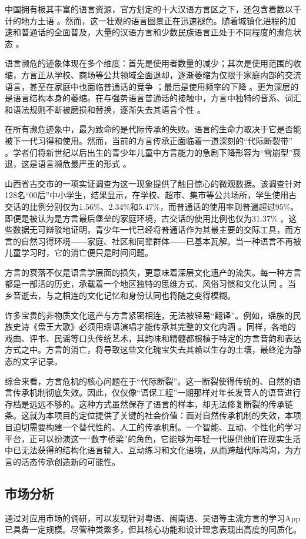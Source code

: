 中国拥有极其丰富的语言资源，官方划定的十大汉语方言区之下，还包含着数以千计的地方土语 。然而，这一壮观的语言图景正在迅速褪色。随着城镇化进程的加速和普通话的全面普及，大量的汉语方言和少数民族语言正处于不同程度的濒危状态 。

语言濒危的迹象体现在多个维度：首先是使用者数量的减少；其次是使用范围的收缩，方言正从学校、商场等公共领域全面退却，逐渐萎缩为仅限于家庭内部的交流语言，甚至在家庭中也面临普通话的竞争 ；最后是使用频率的下降 。更为深层的是语言结构本身的萎缩。在与强势语言普通话的接触中，方言中独特的音系、词汇和语法规则不断被磨损和替换，逐渐失去其语言个性 。

在所有濒危迹象中，最为致命的是代际传承的失败。语言的生命力取决于它是否能被下一代习得和使用。然而，当前的方言传承正面临着一道深刻的“代际断裂带” 。学者们将新世纪以后出生的青少年儿童中方言能力的急剧下降形容为“雪崩型”衰退，这是语言濒危最严重的形式 。

山西省古交市的一项实证调查为这一现象提供了触目惊心的微观数据。该调查针对128名“00后”中小学生，结果显示，在学校、超市、集市等公共场所，学生使用古交话的比例分别仅为1.56\%、2.34\%和5.47\%，而普通话的使用率则普遍超过95\%。即便是被认为是方言最后堡垒的家庭环境，古交话的使用比例也仅为31.37\% 。这些数据无可辩驳地证明，青少年一代已经将普通话作为其最主要的交际工具，而方言的自然习得环境——家庭、社区和同辈群体——已基本瓦解。当一种语言不再被儿童学习时，它的消亡便只是时间问题。

方言的衰落不仅是语言学层面的损失，更意味着深层文化遗产的流失。每一种方言都是一部活的历史，承载着一个地区独特的思维方式、风俗习惯和文化认同 。当乡音逝去，与之相连的文化记忆和身份认同也将随之变得模糊。

许多宝贵的非物质文化遗产与方言紧密相连，无法被轻易“翻译”。例如，瑶族的民族史诗《盘王大歌》必须用瑶语演唱才能传承其完整的文化内涵 。同样，各地的戏曲、评书、民谣等口头传统艺术，其韵味和精髓都根植于特定的方言音韵和表达方式之中。方言的消亡，将导致这些文化瑰宝失去其赖以生存的土壤，最终沦为静态的文字记录。

综合来看，方言危机的核心问题在于“代际断裂”。这一断裂使得传统的、自然的语言传承机制彻底失效。因此，仅仅像“语保工程”一期那样对年长发音人的语音进行存档是远远不够的。这种方式虽然保存了语言的样本，却无法修复断裂的传承链条。这就为本项目的定位提供了关键的社会价值：面对自然传承机制的失效，本项目迫切需要构建一个替代性的、人工的传承机制。一个智能、互动、个性化的学习平台，正可以扮演这一“数字桥梁”的角色，它能够为年轻一代提供他们在现实生活中已无法获得的结构化语言输入、互动练习和文化语境，从而跨越代际鸿沟，为方言的活态传承创造新的可能性。
\subsection{市场分析}
通过对应用市场的调研，可以发现针对粤语、闽南语、吴语等主流方言的学习App已具备一定规模。尽管种类繁多，但其核心功能和设计理念表现出高度的同质化。

